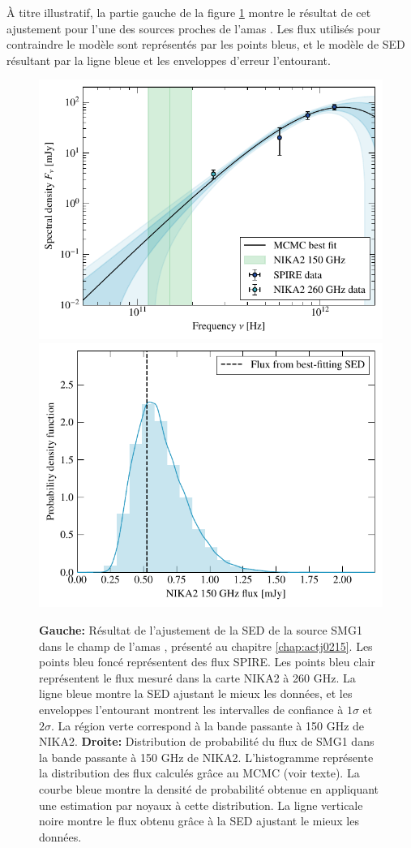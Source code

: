 À titre illustratif, la partie gauche de la figure \ref{fig:pstools_sed} montre le résultat de cet ajustement pour l'une des sources proches de l'amas \act.
Les flux utilisés pour contraindre le modèle sont représentés par les points bleus, et le modèle de SED résultant par la ligne bleue et les enveloppes d'erreur l'entourant.

\begin{figure}[tp]
    \includegraphics[width=0.48\linewidth]{Figures/Chap_decor/1_SED_no2mm.pdf}
    \includegraphics[width=0.48\linewidth]{Figures/Chap_decor/1_2mm_flux_dist.pdf}
    \caption{%
        \textbf{Gauche:} Résultat de l'ajustement de la SED de la source SMG1 dans le champ de l'amas \act, présenté au chapitre \ref{chap:actj0215}.
        Les points bleu foncé représentent des flux SPIRE.
        Les points bleu clair représentent le flux mesuré dans la carte NIKA2 à 260 GHz.
        La ligne bleue montre la SED ajustant le mieux les données, et les enveloppes l'entourant montrent les intervalles de confiance à $1\sigma$ et $2\sigma$.
        La région verte correspond à la bande passante à 150 GHz de NIKA2.
        \textbf{Droite:} Distribution de probabilité du flux de SMG1 dans la bande passante à 150 GHz de NIKA2.
        L'histogramme représente la distribution des flux calculés grâce au MCMC (voir texte).
        La courbe bleue montre la densité de probabilité obtenue en appliquant une estimation par noyaux à cette distribution.
        La ligne verticale noire montre le flux obtenu grâce à la SED ajustant le mieux les données.
        }
        \label{fig:pstools_sed}
\end{figure}


